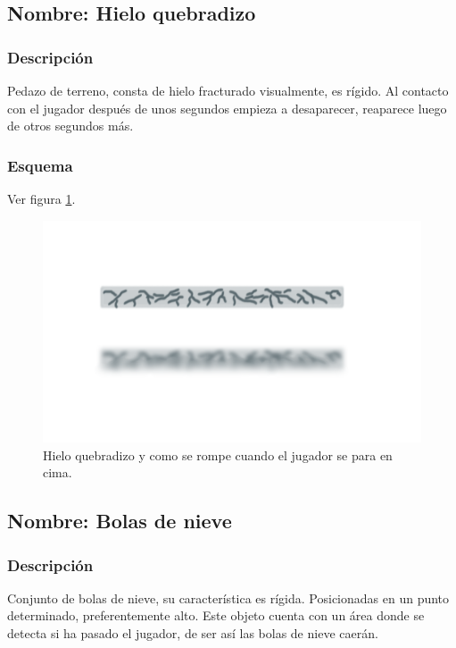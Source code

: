 \documentclass[11pt,letterpaper]{article}
\begin{document}
		\subsection{Nombre: Hielo quebradizo}\label{obs.hieloQ}
	\subsubsection{Descripción}
	Pedazo de terreno, consta de hielo fracturado visualmente, es rígido. Al contacto con el jugador después de unos segundos empieza a desaparecer, reaparece luego de otros segundos más.
	\subsubsection{Esquema}
	Ver figura \ref{fig:hieloQ}.
	\begin{figure}
		\centering
		\includegraphics[height=0.2 \textheight]{Imagenes/hieloQ}
		\caption{Hielo quebradizo y como se rompe cuando el jugador se para en cima.}
		\label{fig:hieloQ}
	\end{figure}
		\subsection{Nombre: Bolas de nieve}\label{obs.bolasN}
	\subsubsection{Descripción}
	Conjunto de bolas de nieve, su característica es rígida. Posicionadas en un punto determinado, preferentemente alto. Este objeto cuenta con un área donde se detecta si ha pasado el jugador, de ser así las bolas de nieve caerán.
\end{document}
